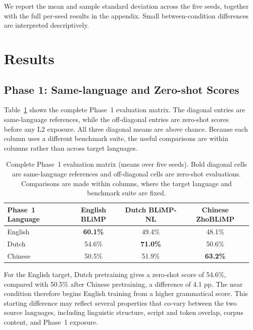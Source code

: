 \documentclass[11pt]{article}
\begin{document}
We report the mean and sample standard deviation across the five seeds, together with the full per-seed results in the appendix. Small between-condition differences are interpreted descriptively.

\section{Results}

\subsection{Phase 1: Same-language and Zero-shot Scores}

Table~\ref{tab:phase1-matrix} shows the complete Phase~1 evaluation matrix. The diagonal entries are same-language references, while the off-diagonal entries are zero-shot scores before any L2 exposure. All three diagonal means are above chance. Because each column uses a different benchmark suite, the useful comparisons are within columns rather than across target languages.

\begin{table}[tb]
\centering
\small
\begin{tabular}{lccc}
\hline
\textbf{Phase~1 Language} & \textbf{English BLiMP} & \textbf{Dutch BLiMP-NL} & \textbf{Chinese ZhoBLiMP} \\ \hline
English & \textbf{60.1\%} & 49.4\% & 48.1\% \\
Dutch   & 54.6\% & \textbf{71.0\%} & 50.6\% \\
Chinese & 50.5\% & 51.9\% & \textbf{63.2\%} \\ \hline
\end{tabular}
\caption{Complete Phase~1 evaluation matrix (means over five seeds). Bold diagonal cells are same-language references and off-diagonal cells are zero-shot evaluations. Comparisons are made within columns, where the target language and benchmark suite are fixed.}
\label{tab:phase1-matrix}
\end{table}

For the English target, Dutch pretraining gives a zero-shot score of 54.6\%, compared with 50.5\% after Chinese pretraining, a difference of 4.1 pp. The near condition therefore begins English training from a higher grammatical score. This starting difference may reflect several properties that co-vary between the two source languages, including linguistic structure, script and token overlap, corpus content, and Phase~1 exposure.
\end{document}
